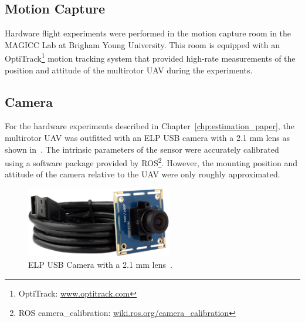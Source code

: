 \subsection{Motion Capture}
Hardware flight experiments were performed in the motion capture room in the
MAGICC Lab at Brigham Young University. This room is equipped with an OptiTrack\footnote{OptiTrack:
\url{www.optitrack.com}}
motion tracking system that
provided high-rate measurements of the position and attitude of the multirotor
UAV during the experiments.

\subsection{Camera}
For the hardware experiments described in Chapter~\ref{chp:estimation_paper},
the multirotor UAV was outfitted with an ELP USB camera with a 2.1 mm lens as
shown in~. The intrinsic parameters of the sensor were
accurately calibrated using a software package provided by ROS\footnote{ROS
camera\_calibration:
\url{wiki.ros.org/camera_calibration}}.
However, the mounting position and attitude of the camera relative to the UAV were only roughly
approximated.

\begin{figure}[h]
  \centering
  \includegraphics[width=2.5in]{figures/camera.jpg}
  \caption[ELP USB Camera with 2.1 mm Lens]{ELP USB Camera with a 2.1 mm
    lens~\cite{webcam}.
}
%
  \label{fig:camera}
\end{figure}


